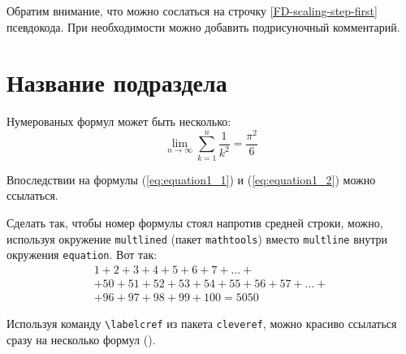 \begin{refsection}
	Обратим внимание, что можно сослаться на строчку \ref{FD-scaling-step-first} псевдокода. При необходимости можно добавить подрисуночный комментарий.
	
	
	
	\section{Название подраздела} \label{sect1_4} %

	
Нумерованых формул может быть несколько:
\begin{equation}
\label{eq:equation1_2}
\lim_{n \to \infty} \sum_{k=1}^n \frac{1}{k^2} = \frac{\pi^2}{6}
\end{equation}

Впоследствии на формулы (\ref{eq:equation1_1}) и (\ref{eq:equation1_2}) можно ссылаться.

Сделать так, чтобы номер формулы стоял напротив средней строки, можно, используя окружение \verb|multlined| (пакет \verb|mathtools|) вместо \verb|multline| внутри окружения \verb|equation|. Вот так:
\begin{equation} %
\label{eq:equation1_3}
\begin{multlined}
1+ 2+3+4+5+6+7+\dots + \\ 
+ 50+51+52+53+54+55+56+57 + \dots + \\ 
+ 96+97+98+99+100=5050 
\end{multlined}
\end{equation}

Используя команду \verb|\labelcref| из пакета \verb|cleveref|, можно
красиво ссылаться сразу на несколько формул
().



\end{refsection}
